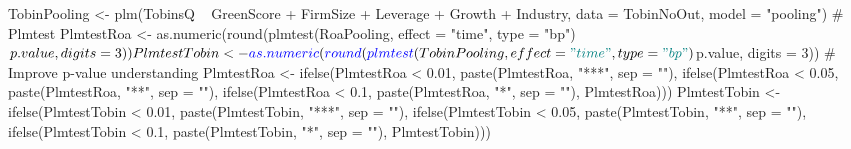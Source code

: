 \documentclass[12pt,]{article}
\newenvironment{Shaded}{}{}
\newcommand{\KeywordTok}[1]{\textcolor[rgb]{0.00,0.00,1.00}{#1}}
\newcommand{\DataTypeTok}[1]{#1}
\newcommand{\DecValTok}[1]{#1}
\newcommand{\FloatTok}[1]{#1}
\newcommand{\StringTok}[1]{\textcolor[rgb]{0.00,0.50,0.50}{#1}}
\newcommand{\CommentTok}[1]{\textcolor[rgb]{0.00,0.50,0.00}{#1}}
\newcommand{\OperatorTok}[1]{#1}
\newcommand{\NormalTok}[1]{#1}
\begin{document}
\begin{Shaded}
\begin{Highlighting}[]
{{{{\NormalTok{TobinPooling <-}\StringTok{ }\KeywordTok{plm}\NormalTok{(TobinsQ }\OperatorTok{~}\StringTok{ }\NormalTok{GreenScore }\OperatorTok{+}\StringTok{ }\NormalTok{FirmSize }\OperatorTok{+}\StringTok{ }\NormalTok{Leverage }\OperatorTok{+}\StringTok{ }
\StringTok{    }\NormalTok{Growth }\OperatorTok{+}\StringTok{ }\NormalTok{Industry, }\DataTypeTok{data =}\NormalTok{ TobinNoOut, }\DataTypeTok{model =} \StringTok{"pooling"}\NormalTok{)}
\CommentTok{# Plmtest}
\NormalTok{PlmtestRoa <-}\StringTok{ }\KeywordTok{as.numeric}\NormalTok{(}\KeywordTok{round}\NormalTok{(}\KeywordTok{plmtest}\NormalTok{(RoaPooling, }\DataTypeTok{effect =} \StringTok{"time"}\NormalTok{, }
    \DataTypeTok{type =} \StringTok{"bp"}\NormalTok{)}\OperatorTok{$}\NormalTok{p.value, }\DataTypeTok{digits =} \DecValTok{3}\NormalTok{))}
\NormalTok{PlmtestTobin <-}\StringTok{ }\KeywordTok{as.numeric}\NormalTok{(}\KeywordTok{round}\NormalTok{(}\KeywordTok{plmtest}\NormalTok{(TobinPooling, }\DataTypeTok{effect =} \StringTok{"time"}\NormalTok{, }
    \DataTypeTok{type =} \StringTok{"bp"}\NormalTok{)}\OperatorTok{$}\NormalTok{p.value, }\DataTypeTok{digits =} \DecValTok{3}\NormalTok{))}
\CommentTok{# Improve p-value understanding}
\NormalTok{PlmtestRoa <-}\StringTok{ }\KeywordTok{ifelse}\NormalTok{(PlmtestRoa }\OperatorTok{<}\StringTok{ }\FloatTok{0.01}\NormalTok{, }\KeywordTok{paste}\NormalTok{(PlmtestRoa, }
    \StringTok{"***"}\NormalTok{, }\DataTypeTok{sep =} \StringTok{""}\NormalTok{), }\KeywordTok{ifelse}\NormalTok{(PlmtestRoa }\OperatorTok{<}\StringTok{ }\FloatTok{0.05}\NormalTok{, }\KeywordTok{paste}\NormalTok{(PlmtestRoa, }
    \StringTok{"**"}\NormalTok{, }\DataTypeTok{sep =} \StringTok{""}\NormalTok{), }\KeywordTok{ifelse}\NormalTok{(PlmtestRoa }\OperatorTok{<}\StringTok{ }\FloatTok{0.1}\NormalTok{, }\KeywordTok{paste}\NormalTok{(PlmtestRoa, }
    \StringTok{"*"}\NormalTok{, }\DataTypeTok{sep =} \StringTok{""}\NormalTok{), PlmtestRoa)))}
\NormalTok{PlmtestTobin <-}\StringTok{ }\KeywordTok{ifelse}\NormalTok{(PlmtestTobin }\OperatorTok{<}\StringTok{ }\FloatTok{0.01}\NormalTok{, }\KeywordTok{paste}\NormalTok{(PlmtestTobin, }
    \StringTok{"***"}\NormalTok{, }\DataTypeTok{sep =} \StringTok{""}\NormalTok{), }\KeywordTok{ifelse}\NormalTok{(PlmtestTobin }\OperatorTok{<}\StringTok{ }\FloatTok{0.05}\NormalTok{, }\KeywordTok{paste}\NormalTok{(PlmtestTobin, }
    \StringTok{"**"}\NormalTok{, }\DataTypeTok{sep =} \StringTok{""}\NormalTok{), }\KeywordTok{ifelse}\NormalTok{(PlmtestTobin }\OperatorTok{<}\StringTok{ }\FloatTok{0.1}\NormalTok{, }\KeywordTok{paste}\NormalTok{(PlmtestTobin, }
    \StringTok{"*"}\NormalTok{, }\DataTypeTok{sep =} \StringTok{""}\NormalTok{), PlmtestTobin)))}
}}}}
\end{Highlighting}
\end{Shaded}
\end{document}
